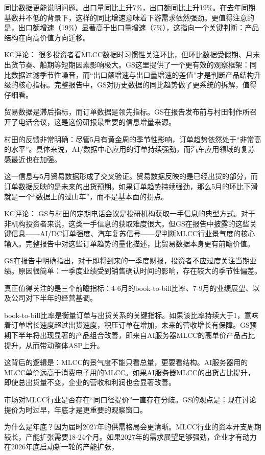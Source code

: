 \documentclass[11pt]{ctexart}
\begin{document}
同比数据更能说明问题。出口量同比上升7\%，出口额同比上升19\%。在去年同期基数并不低的背景下，这样的同比增速意味着下游需求依然强劲。更值得注意的是，出口额增速（19\%）显著高于出口量增速（7\%），这指向一个关键判断：产品结构在向高价值方向迁移。

KC评论： 很多投资者看MLCC数据时习惯性关注环比，但环比数据受假期、月末出货节奏、船期等短期因素影响极大。GS这里提供了一个更有效的观察框架：同比数据过滤季节性噪音，而“出口额增速与出口量增速的差值”才是判断产品结构升级的核心指标。完整报告中，GS对历史数据的同比趋势做了更系统的拆解，值得仔细看。

贸易数据是滞后指标，而订单数据是领先指标。GS在报告发布前与村田制作所召开了电话会议，这是这份研报最重要的信息增量来源。

村田的反馈非常明确：尽管5月有黄金周的季节性影响，订单趋势依然处于“非常高的水平”。具体来说，AI/数据中心应用的订单持续强劲，而汽车应用领域的复苏感最近也在加强。

这一信息与5月贸易数据形成了交叉验证。贸易数据反映的是已经出货的部分，而订单数据反映的是未来的出货预期。如果订单趋势持续强劲，那么5月的环比下滑就是一个“数据上的过山车”，而不是基本面的拐点。

KC评论： GS与村田的定期电话会议是投研机构获取一手信息的典型方式。对于非机构投资者来说，这类一手信息的获取难度很大。但GS在报告中披露的这些关键信息——AI/DC订单强度、汽车复苏信号——是判断MLCC行业景气度的核心输入。完整报告中对这些订单趋势的量化描述，比贸易数据本身更有前瞻价值。

GS在报告中明确指出，对于即将到来的一季度财报，投资者不应过度关注当期业绩。原因很简单：一季度业绩受到销售确认时间的影响，存在较大的季节性偏差。

真正值得关注的是三个前瞻指标：4-6月的book-to-bill比率、7-9月的业绩展望、以及公司对下半年的经营基调。

book-to-bill比率是衡量订单与出货关系的关键指标。如果该比率持续大于1，意味着订单增长速度超过出货速度，积压订单在增加，未来的营收增长有保障。GS预期下半年将出现显著的产品组合改善，即来自AI服务器MLCC的高单价产品占比提升，从而带动整体ASP上升。

这背后的逻辑是：MLCC的景气度不能只看总量，更要看结构。AI服务器用的MLCC单价远高于消费电子用的MLCC。如果AI服务器MLCC的出货占比提升，即使总出货量不变，企业的营收和利润也会显著改善。

市场对MLCC行业是否存在“同口径提价”一直存在分歧。GS的观点是：现在讨论提价为时过早，年底才是更重要的观察窗口。

为什么是年底？因为届时2027年的供需格局会更清晰。MLCC行业的资本开支周期较长，产能扩张需要18-24个月。如果2027年的需求展望足够强劲，企业才有动力在2026年底启动新一轮的产能扩张，
\end{document}
